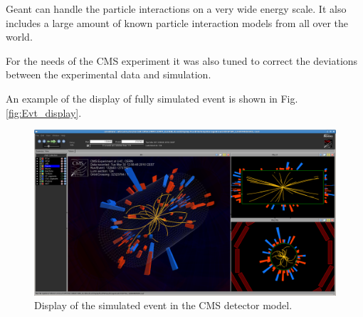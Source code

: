 Geant can handle the particle interactions on a very wide energy scale. It also includes a large amount of known particle interaction models
from all over the world.

For the needs of the CMS experiment it was also tuned to correct the deviations between the experimental data and simulation.

An example of the display of fully simulated event is shown in Fig. \ref{fig:Evt_display}.

 \begin{figure}[h]
  \centering
  \includegraphics[width=1.0\textwidth]{03_simulation/plots/CMS1stEvent.png}
  \caption{Display of the simulated event in the CMS detector model.}
  \label{fig:Lund}
 \end{figure}